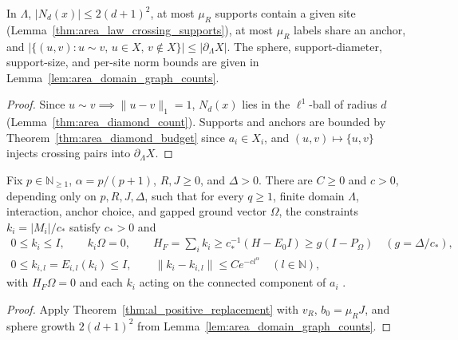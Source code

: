 \begin{lemma}
    \label{thm:al_lattice_counts}
    \leanok
    In $\Lambda$, $|N_d(x)|\le2(d+1)^2$, at most $\mu_R$ supports contain a
    given site (Lemma~\ref{thm:area_law_crossing_supports}), at most $\mu_R$
    labels share an anchor, and
    $|\{(u,v):u\sim v,\,u\in X,\,v\notin X\}|\le|\partial_\Lambda X|$. The
    sphere, support-diameter, support-size, and per-site norm bounds are given
    in Lemma~\ref{lem:area_domain_graph_counts}.
\end{lemma}
\begin{proof}\leanok
    Since $u\sim v\implies\|u-v\|_1=1$, $N_d(x)$ lies in the $\ell^1$-ball of
    radius $d$ (Lemma~\ref{thm:area_diamond_count}). Supports and anchors are
    bounded by Theorem~\ref{thm:area_diamond_budget} since $a_i\in X_i$, and
    $(u,v)\mapsto\{u,v\}$ injects crossing pairs into $\partial_\Lambda X$.
\end{proof}

\begin{theorem}
    \label{thm:al_lattice_positive_replacement}
    \leanok
    Fix $p\in\mathbb N_{\ge1}$, $\alpha=p/(p+1)$, $R,J\ge0$, and $\Delta>0$.
    There are $C\ge0$ and $c>0$, depending only on $p,R,J,\Delta$, such that for
    every $q\ge1$, finite domain $\Lambda$, interaction, anchor choice, and
    gapped ground vector $\Omega$, the constraints $k_i=|M_i|/c_*$ satisfy
    $c_*>0$ and
    \begin{align}
        0\le k_i\le I,\qquad k_i\Omega=0,\qquad
        H_F=\sum_ik_i\ge c_*^{-1}(H-E_0I)\ge g(I-P_\Omega)\quad(g=\Delta/c_*),
        \label{eq:al_lattice_positive_replacement_gap} \\
        0\le k_{i,l}=E_{i,l}(k_i)\le I,\qquad
        \|k_i-k_{i,l}\|\le Ce^{-cl^\alpha}\quad(l\in\mathbb N),
        \label{eq:al_lattice_positive_replacement_tail}
    \end{align}
    with $H_F\Omega=0$ and each $k_i$ acting on the connected component of
    $a_i$ \cite[Proposition~4.3]{OpenAI2026AreaLaw}.
\end{theorem}
\begin{proof}\leanok
    Apply Theorem~\ref{thm:al_positive_replacement} with $v_R$, $b_0=\mu_RJ$,
    and sphere growth $2(d+1)^2$ from Lemma~\ref{lem:area_domain_graph_counts}.
\end{proof}

